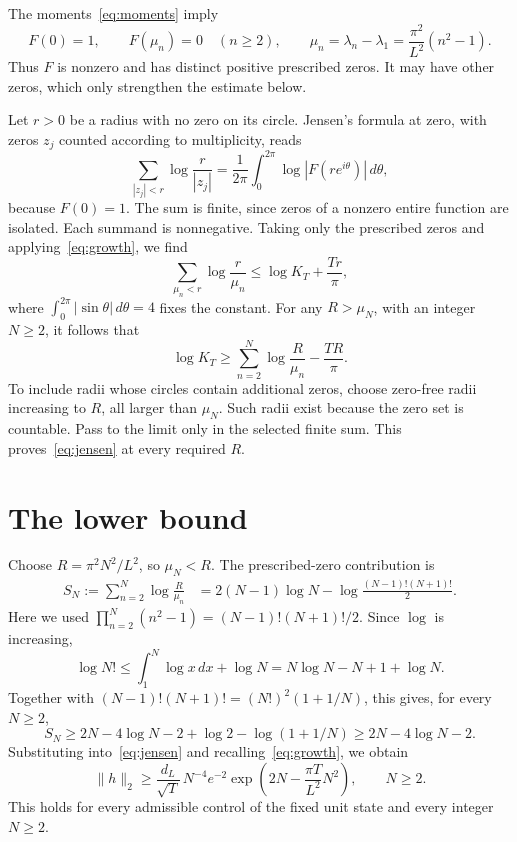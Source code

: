 \documentclass[11pt]{article}
\begin{document}
The moments~\eqref{eq:moments} imply
\begin{equation}\label{eq:zeros}
 F(0)=1,\qquad F(\mu_n)=0\quad(n\ge2),\qquad
 \mu_n=\lambda_n-\lambda_1=\frac{\pi^2}{L^2}(n^2-1).
\end{equation}
Thus $F$ is nonzero and has distinct positive prescribed zeros. It may have
other zeros, which only strengthen the estimate below.

Let $r>0$ be a radius with no zero on its circle. Jensen's formula at zero,
with zeros $z_j$ counted according to multiplicity, reads
\[
 \sum_{|z_j|<r}\log\frac r{|z_j|}
 =\frac1{2\pi}\int_0^{2\pi}\log|F(re^{i\theta})|\,d\theta,
\]
because $F(0)=1$. The sum is finite, since zeros of a nonzero entire function
are isolated. Each summand is nonnegative. Taking only the prescribed zeros
and applying~\eqref{eq:growth}, we find
\[
 \sum_{\mu_n<r}\log\frac r{\mu_n}
 \le\log K_T+\frac{Tr}{\pi},
\]
where $\int_0^{2\pi}|\sin\theta|\,d\theta=4$ fixes the constant.
For any $R>\mu_N$, with an integer $N\ge2$, it follows that
\begin{equation}\label{eq:jensen}
 \log K_T\ge\sum_{n=2}^{N}\log\frac R{\mu_n}-\frac{TR}{\pi}.
\end{equation}
To include radii whose circles contain additional zeros, choose zero-free
radii increasing to $R$, all larger than $\mu_N$. Such radii exist because
the zero set is countable. Pass to the limit only in the selected finite
sum. This proves~\eqref{eq:jensen} at every required $R$.

\section{The lower bound}\label{sec:bound}
Choose $R=\pi^2N^2/L^2$, so $\mu_N<R$. The prescribed-zero contribution is
\begin{align}
 S_N:=\sum_{n=2}^{N}\log\frac R{\mu_n}
 &=2(N-1)\log N-\log\frac{(N-1)!(N+1)!}{2}.\label{eq:product}
\end{align}
Here we used $\prod_{n=2}^{N}(n^2-1)=(N-1)!(N+1)!/2$.
Since $\log$ is increasing,
\[
 \log N!\le\int_1^N\log x\,dx+\log N
 =N\log N-N+1+\log N.
\]
Together with $(N-1)!(N+1)!=(N!)^2(1+1/N)$, this gives, for every $N\ge2$,
\begin{equation}\label{eq:sum-bound}
 S_N\ge2N-4\log N-2+\log2-\log(1+1/N)
 \ge2N-4\log N-2.
\end{equation}
Substituting into~\eqref{eq:jensen} and recalling~\eqref{eq:growth}, we obtain
\begin{equation}\label{eq:integer-bound}
 \|h\|_2\ge\frac{d_L}{\sqrt T}\,N^{-4}e^{-2}
 \exp\!\left(2N-\frac{\pi T}{L^2}N^2\right),\qquad N\ge2.
\end{equation}
This holds for every admissible control of the fixed unit state and every
integer $N\ge2$.
\end{document}

